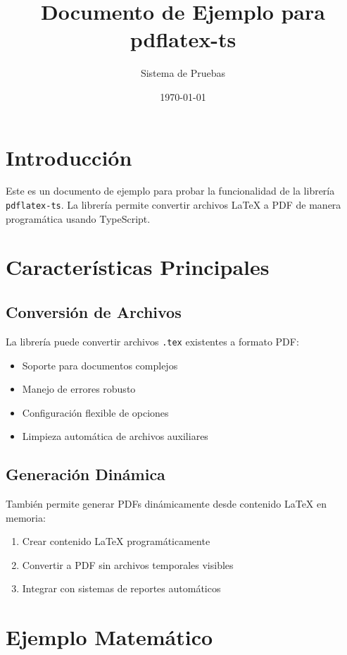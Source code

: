 \documentclass[12pt]{article}
\title{Documento de Ejemplo para pdflatex-ts}
\author{Sistema de Pruebas}
\date{\today}
\begin{document}
\maketitle

\tableofcontents
\newpage

\section{Introducción}

Este es un documento de ejemplo para probar la funcionalidad de la librería \texttt{pdflatex-ts}. 
La librería permite convertir archivos LaTeX a PDF de manera programática usando TypeScript.

\section{Características Principales}

\subsection{Conversión de Archivos}
La librería puede convertir archivos \texttt{.tex} existentes a formato PDF:

\begin{itemize}
    \item Soporte para documentos complejos
    \item Manejo de errores robusto
    \item Configuración flexible de opciones
    \item Limpieza automática de archivos auxiliares
\end{itemize}

\subsection{Generación Dinámica}
También permite generar PDFs dinámicamente desde contenido LaTeX en memoria:

\begin{enumerate}
    \item Crear contenido LaTeX programáticamente
    \item Convertir a PDF sin archivos temporales visibles
    \item Integrar con sistemas de reportes automáticos
\end{enumerate}

\section{Ejemplo Matemático}
\end{document}
